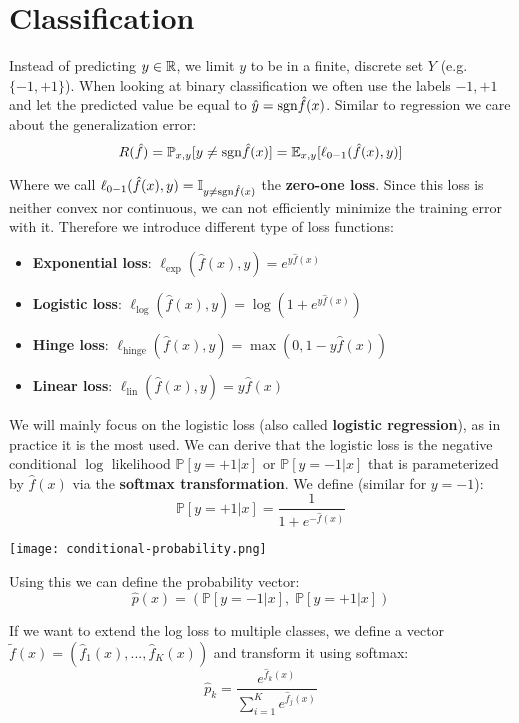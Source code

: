 \section{Classification}

Instead of predicting $y \in \mathbb{R}$, we limit $y$ to be in a finite, discrete set $Y$ (e.g. $\{-1, +1\}$). When looking at binary classification we often use the labels $-1, +1$ and let the predicted value be equal to $\hat{y} = \text{sgn}\hat{f}(x)$. Similar to regression we care about the generalization error:
$$R(\hat{f}) = \mathbb{P}_{x,y} [y \neq \text{sgn} \hat{f}(x)] = \mathbb{E}_{x,y}[\ell_{0-1}(\hat{f}(x), y)]$$

Where we call $\ell_{0-1}(\hat{f}(x), y) = \mathbb{I}_{y \neq \text{sgn} \hat{f}(x)}$ the \textbf{zero-one loss}. Since this loss is neither convex nor continuous, we can not efficiently minimize the training error with it. Therefore we introduce different type of loss functions:
\begin{itemize}
	\item \textbf{Exponential loss}: $\ell_\text{exp}(\hat{f}(x), y) = e^{y \hat{f}(x)}$
	\item \textbf{Logistic loss}: $\ell_\text{log}(\hat{f}(x), y) = \log(1 + e^{y \hat{f}(x)})$
	\item \textbf{Hinge loss}: $\ell_\text{hinge}(\hat{f}(x), y) = \max(0, 1-y \hat{f}(x))$
	\item \textbf{Linear loss}: $\ell_\text{lin}(\hat{f}(x), y) = y \hat{f}(x)$
\end{itemize}

We will mainly focus on the logistic loss (also called \textbf{logistic regression}), as in practice it is the most used. We can derive that the logistic loss is the negative conditional $\log$ likelihood $\mathbb{P}[y = +1 | x]$ or $\mathbb{P}[y = -1 | x]$ that is parameterized by $\hat{f}(x)$ via the \textbf{softmax transformation}. We define (similar for $y = -1$): $$\mathbb{P}[y = +1 | x] = \frac{1}{1 + e^{- \hat{f}(x)}}$$

\texttt{[image: conditional-probability.png]}

Using this we can define the probability vector:
$$\hat{p}(x) = (\mathbb{P}[y = -1 | x], \; \mathbb{P}[y = +1 | x])$$

If we want to extend the log loss to multiple classes, we define a vector $\tilde{f}(x) = (\hat{f}_1(x), ..., \hat{f}_K(x))$ and transform it using softmax:
$$\hat{p}_k = \frac{e^{\hat{f}_k(x)}}{\sum_{i=1}^K e^{\hat{f}_j(x)}}$$

